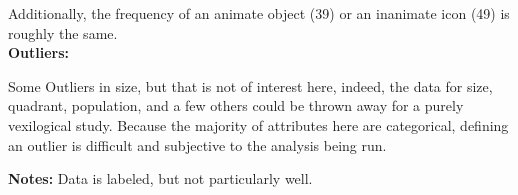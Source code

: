 \documentclass[11pt]{article}
\begin{document}
Additionally, the frequency of an animate object (39) or an inanimate icon (49) is roughly the same.\\

\textbf{Outliers:}
	
	Some Outliers in size, but that is not of interest here, indeed, the data for size, quadrant, population, and a few others could be thrown away for a purely vexilogical study. Because the majority of attributes here are categorical, defining an outlier is difficult and subjective to the analysis being run.
	
\textbf{Notes:}
	Data is labeled, but not particularly well.
	
\end{document}
